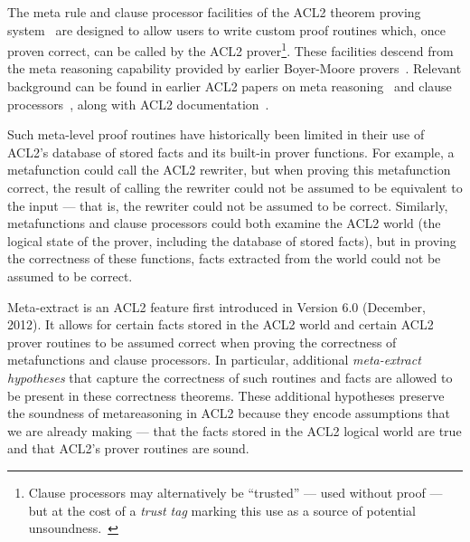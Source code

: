 The meta rule and clause processor facilities
of the ACL2 theorem proving system~\cite{acl2:home}
are designed to allow
users to write custom proof routines which, once proven
correct, can be called by the ACL2 prover\footnote{
  Clause processors may alternatively be ``trusted'' --- used without
  proof --- but at the
  cost of a {\em trust tag} marking this use as a source of potential
  unsoundness.~\cite{trusted-cl-proc}}.
These facilities descend from the meta reasoning capability
provided by earlier Boyer-Moore provers~\cite{meta}.  Relevant
background can be found in earlier ACL2 papers on meta
reasoning~\cite{meta-05} and clause processors~\cite{trusted-cl-proc},
along with ACL2 documentation~\cite{acl2:doc}.

Such meta-level proof routines have historically been limited in their use of
ACL2's database of stored facts and its built-in prover functions.
For example, a metafunction could call the ACL2 rewriter, but when
proving this metafunction correct, the result of calling the rewriter
could not be assumed to be equivalent to the input --- that is, the
rewriter could not be assumed to be correct.  Similarly,
metafunctions and clause processors could both examine the ACL2 world
(the logical state of the prover, including the database of stored
facts), but in proving the correctness of these functions, facts
extracted from the world could not be assumed to be correct.

Meta-extract is an ACL2 feature first introduced in Version 6.0
(December, 2012).  It allows for certain facts stored in the ACL2
world and certain ACL2 prover routines to be assumed
correct when proving the correctness of metafunctions and clause
processors.  In particular, additional \textit{meta-extract hypotheses}
that capture the correctness of such routines and facts are allowed to
be present in these correctness theorems. These additional hypotheses
preserve the soundness of metareasoning in ACL2 because they encode
assumptions that we are already
making --- that the facts stored in the ACL2 logical world are true
and that ACL2's prover routines are sound.

